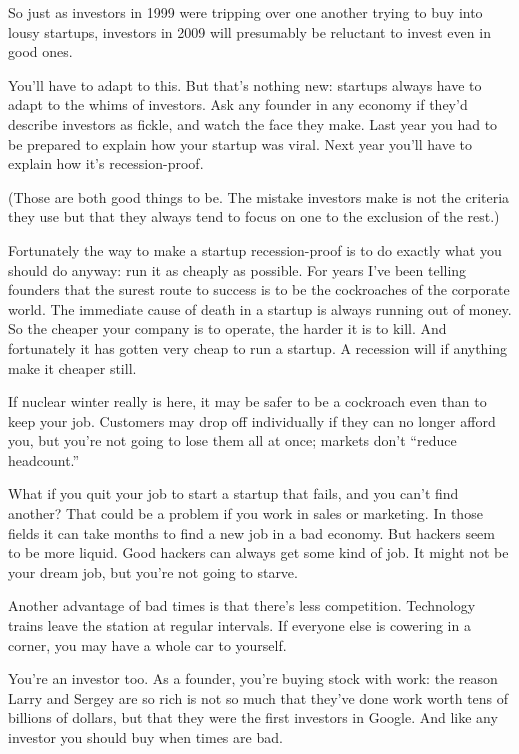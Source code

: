 \documentclass[12pt]{book}
\begin{document}
So just as investors in 1999 were tripping over one another trying to
buy into lousy startups, investors in 2009 will presumably be reluctant
to invest even in good ones.

You'll have to adapt to this. But that's nothing new: startups always
have to adapt to the whims of investors. Ask any founder in any economy
if they'd describe investors as fickle, and watch the face they make.
Last year you had to be prepared to explain how your startup was viral.
Next year you'll have to explain how it's recession-proof.

(Those are both good things to be. The mistake investors make is not the
criteria they use but that they always tend to focus on one to the
exclusion of the rest.)

Fortunately the way to make a startup recession-proof is to do exactly
what you should do anyway: run it as cheaply as possible. For years I've
been telling founders that the surest route to success is to be the
cockroaches of the corporate world. The immediate cause of death in a
startup is always running out of money. So the cheaper your company is
to operate, the harder it is to kill. And fortunately it has gotten very
cheap to run a startup. A recession will if anything make it cheaper
still.

If nuclear winter really is here, it may be safer to be a cockroach even
than to keep your job. Customers may drop off individually if they can
no longer afford you, but you're not going to lose them all at once;
markets don't ``reduce headcount.''

What if you quit your job to start a startup that fails, and you can't
find another? That could be a problem if you work in sales or marketing.
In those fields it can take months to find a new job in a bad economy.
But hackers seem to be more liquid. Good hackers can always get some
kind of job. It might not be your dream job, but you're not going to
starve.

Another advantage of bad times is that there's less competition.
Technology trains leave the station at regular intervals. If everyone
else is cowering in a corner, you may have a whole car to yourself.

You're an investor too. As a founder, you're buying stock with work: the
reason Larry and Sergey are so rich is not so much that they've done
work worth tens of billions of dollars, but that they were the first
investors in Google. And like any investor you should buy when times are
bad.
\end{document}
